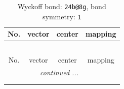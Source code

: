 \documentclass[fleqn,8pt]{jsarticle}
\begin{document}
\renewcommand{\arraystretch}{1.2}
\begin{longtable}{cccc}
\caption{Wyckoff bond: {\tt 24b@8g}, bond symmetry: {\tt 1}}
 \\
 \hline \hline
No. & vector & center & mapping \\ \hline \endfirsthead

\multicolumn{3}{l}{\tablename\ \thetable{}} \\
 \hline \hline
No. & vector & center & mapping \\ \hline \endhead

 \hline \hline
\multicolumn{3}{r}{\footnotesize\it continued ...} \\ \endfoot

 \hline \hline
\multicolumn{3}{r}{} \\ \endlastfoot


\end{longtable}
\end{document}
